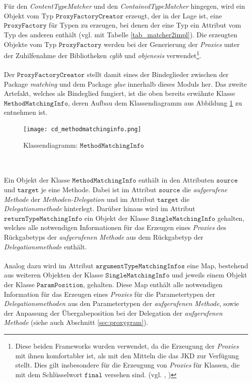 \\\\
Für den \emph{ContentTypeMatcher} und den \emph{ContainedTypeMatcher} hingegen, wird ein Objekt vom Typ $\texttt{ProxyFactoryCreator}$ erzeugt, der in der Lage ist, eine $\texttt{ProxyFactory}$ für Typen zu erzeugen, bei denen der eine Typ ein Attribut vom Typ des anderen enthält (vgl. mit Tabelle \ref{tab_matcher2impl}). Die erzeugten Objekte vom Typ $\texttt{ProxyFactory}$ werden bei der Generierung der \emph{Proxies} unter der Zuhilfenahme der Bibliotheken \emph{cglib} und \emph{objenesis} verwendet\footnote{Diese beiden Frameworks wurden verwendet, da die Erzeugung der \emph{Proxies} mit ihnen komfortabler ist, als mit den Mitteln die das JKD zur Verfügung stellt. Dies gilt insbesondere für die Erzeugung von \emph{Proxies} für Klassen, die mit dem Schlüsselwort $\texttt{final}$ versehen sind. (vgl. \cite{objenesis}, \cite{cglib})}.
\\\\
Der $\texttt{ProxyFactoryCreator}$ stellt damit eines der Bindeglieder zwischen der Package \emph{matching} und dem Package \emph{glue} innerhalb dieses \Gls{Modul}s her. Das zweite Artefakt, welches als Bindeglied fungiert, ist die oben bereits erwähnte Klasse $\texttt{MethodMatchingInfo}$, deren Aufbau dem Klassendiagramm aus Abbildung \ref{cd_methodMatchingInfo} zu entnehmen ist.
\begin{figure}[h!]
\texttt{[image: cd\_methodmatchinginfo.png]}
\caption{Klassendiagramm: $\texttt{MethodMatchingInfo}$}
\label{cd_methodMatchingInfo}
\end{figure}
\noindent
\\\\
Ein Objekt der Klasse $\texttt{MethodMatchingInfo}$ enthält in den Attributen $\texttt{source}$ und $\texttt{target}$ je eine Methode. Dabei ist im Attribut $\texttt{source}$ die \emph{aufgerufene Methode} der \emph{Methoden-Delegation} und im Attribut $\texttt{target}$ die \emph{Delegationsmethode} hinterlegt. Darüber hinaus wird im Attribut $\texttt{returnTypeMatchingInfo}$ ein Objekt der Klasse $\texttt{SingleMatchingInfo}$ gehalten, welches alle notwendigen Informationen für das Erzeugen eines \emph{Proxies} des Rückgabetyps der \emph{aufgerufenen Methode} aus dem Rückgabetyp der \emph{Delegationsmethode} enthält.
\\\\
Analog dazu wird im Attribut $\texttt{argumentTypeMatchingInfos}$ eine Map, bestehend aus weiteren Objekten der Klasse $\texttt{SingleMatchingInfo}$ und jeweils einem Objekt der Klasse $\texttt{ParamPosition}$, gehalten. Diese Map enthält alle notwendigen Information für das Erzeugen eines \emph{Proxies} für die Parametertypen der \emph{Delegationsmethoden} aus den Parametertypen der \emph{aufgerufenen Methode}, sowie der Anpassung der Übergabeposition bei der Delegation der \emph{aufgerufenen Methode} (siehe auch Abschnitt \ref{sec:proxygram}).
